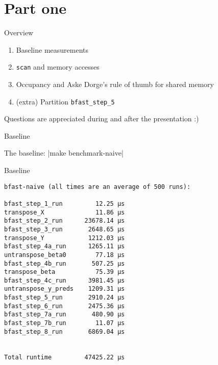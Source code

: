 \section{Part one}

\begin{frame}[fragile]{Overview}
\begin{enumerate}
    \item Baseline measurements
    \item \texttt{scan} and memory accesses
    \item Occupancy and Aske Dorge's rule of thumb for shared
        memory%
    \item (extra) Partition \texttt{bfast\_step\_5}
\end{enumerate}
    \pause
Questions are appreciated during and after the presentation :)
\end{frame}


\begin{frame}[fragile]{Baseline}

The baseline: |make benchmark-naive|

\end{frame}

\begin{frame}[fragile]{Baseline}
    \centering
    \begin{verbatim}
bfast-naive (all times are an average of 500 runs):

bfast_step_1_run         12.25 µs
transpose_X              11.86 µs
bfast_step_2_run      23678.14 µs
bfast_step_3_run       2648.65 µs
transpose_Y            1212.03 µs
bfast_step_4a_run      1265.11 µs
untranspose_beta0        77.18 µs
bfast_step_4b_run       507.25 µs
transpose_beta           75.39 µs
bfast_step_4c_run      3981.45 µs
untranspose_y_preds    1209.31 µs
bfast_step_5_run       2910.24 µs
bfast_step_6_run       2475.36 µs
bfast_step_7a_run       480.90 µs
bfast_step_7b_run        11.07 µs
bfast_step_8_run       6869.04 µs


Total runtime         47425.22 µs
\end{verbatim}

\end{frame}

